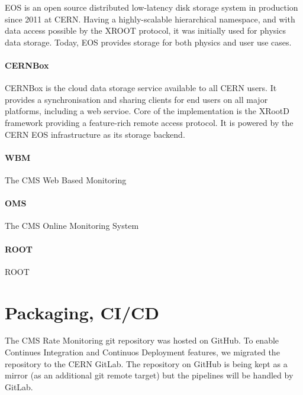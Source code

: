 EOS \cite{Peters_2015} is an open source distributed low-latency disk storage system in production since 2011 at CERN. Having a highly-scalable hierarchical namespace, and with data access possible by the XROOT protocol, it was initially used for physics data storage. Today, EOS provides storage for both physics and user use cases.

\paragraph{CERNBox}

CERNBox \cite{Mascetti_2015} is the cloud data storage service available to all CERN users. It provides a synchronisation and sharing clients for end users on all major platforms, including a web servioe. Core of the implementation is the XRootD framework providing a feature-rich remote access protocol.  It is powered by the CERN EOS infrastructure as its storage backend.

\paragraph{WBM} The CMS Web Based Monitoring \cite{badgett2014web}

\paragraph{OMS} The CMS Online Monitoring System \cite{Andre2649402} 

\paragraph{ROOT} ROOT \cite{Brun:1997pa} 


\section{Packaging, CI/CD}

The CMS Rate Monitoring git repository was hosted on GitHub. To enable Continues Integration and Continuos Deployment features, we migrated the repository to the CERN GitLab. The repository on GitHub is being kept as a mirror (as an additional git remote target) but the pipelines will be handled by GitLab.


